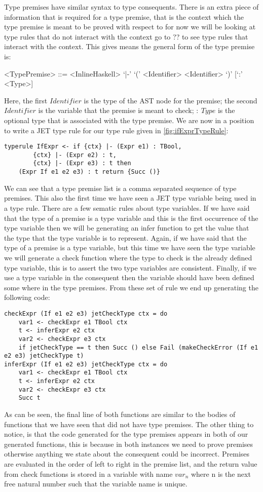 Type premises have similar syntax to type consequents.
There is an extra piece of information that is required for a type premise, that is the context which the type premise is meant to be proved with respect to for now we will be looking at type rules that do not interact with the context go to ?? to see type rules that interact with the context.
This gives means the general form of the type premise is:
\begin{grammar}
<TypePremise> ::= <InlineHaskell> `|-' `(' <Identifier> <Identifier> `)' [`:' <Type>]
\end{grammar}
Here, the first $Identifier$ is the type of the AST node for the premise; the second $Identifier$ is the variable that the premise is meant to check; $:\ Type$ is the optional type that is associated with the type premise.
We are now in a position to write a JET type rule for our type rule given in \autoref{fig:ifExprTypeRule}:
\begin{lstlisting}
typerule IfExpr <- if {ctx} |- (Expr e1) : TBool, 
        {ctx} |- (Expr e2) : t, 
        {ctx} |- (Expr e3) : t then 
    (Expr If e1 e2 e3) : t return {Succ ()}
\end{lstlisting}
We can see that a type premise list is a comma separated sequence of type premises.
This also the first time we have seen a JET type variable being used in a type rule.
There are a few sematic rules about type variables.
If we have said that the type of a premise is a type variable and this is the first occurrence of the type variable then we will be generating an infer function to get the value that the type that the type variable is to represent.
Again, if we have said that the type of a premise is a type variable, but this time we have seen the type variable we will generate a check function where the type to check is the already defined type variable, this is to assert the two type variables are consistent.
Finally, if we use a type variable in the consequent then the variable should have been defined some where in the type premises.
From these set of rule we end up generating the following code:
\begin{lstlisting}
checkExpr (If e1 e2 e3) jetCheckType ctx = do
    var1 <- checkExpr e1 TBool ctx
    t <- inferExpr e2 ctx
    var2 <- checkExpr e3 ctx
    if jetCheckType == t then Succ () else Fail (makeCheckError (If e1 e2 e3) jetCheckType t)
inferExpr (If e1 e2 e3) jetCheckType ctx = do
    var1 <- checkExpr e1 TBool ctx
    t <- inferExpr e2 ctx
    var2 <- checkExpr e3 ctx
    Succ t
\end{lstlisting}
As can be seen, the final line of both functions are similar to the bodies of functions that we have seen that did not have type premises.
The other thing to notice, is that the code generated for the type premises appears in both of our generated functions, this is because in both instances we need to prove premises otherwise anything we state about the consequent could be incorrect.
Premises are evaluated in the order of left to right in the premise list, and the return value from check functions is stored in a variable with name $var_n$ where n is the next free natural number such that the variable name is unique.

